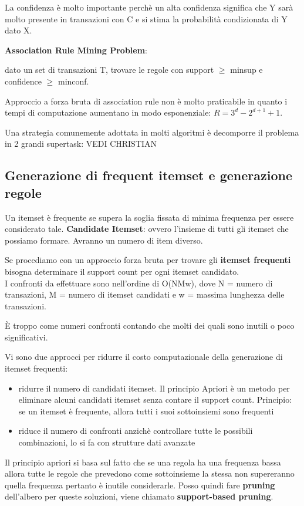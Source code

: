 La confidenza \`e molto importante perch\`e un alta confidenza significa che Y sar\`a molto presente in transazioni con C e si stima la probabilit\`a  condizionata di Y dato X.

\textbf{Association Rule Mining Problem}:

dato un set di transazioni T, trovare le regole con support $\ge$ minsup e confidence $\ge$ minconf.

Approccio a forza bruta di association rule non \`e molto praticabile in quanto i tempi di computazione aumentano in modo esponenziale: $R = 3^d - 2^{d+1} + 1$.

Una strategia comunemente adottata in molti algoritmi \`e decomporre il problema in 2 grandi supertask:
VEDI CHRISTIAN


\subsection{Generazione di frequent itemset e generazione regole}

Un itemset \`e frequente se supera la soglia fissata di minima frequenza per essere considerato tale. 
\textbf{Candidate Itemset}: ovvero l'insieme di tutti gli itemset che possiamo formare. Avranno un numero di item diverso. 

Se procediamo con un approccio forza bruta per trovare gli \textbf{itemset frequenti} bisogna determinare il support count per ogni itemset candidato. \\
I confronti da effettuare sono nell'ordine di O(NMw), dove N = numero di transazioni, M = numero di itemset candidati e w = massima lunghezza delle transazioni. 

\`E troppo come numeri confronti contando che molti dei quali sono inutili o poco significativi.

Vi sono due approcci per ridurre il costo computazionale della generazione di itemset frequenti:
\begin{itemize}
	\item ridurre il numero di candidati itemset. Il principio Apriori \`e un metodo per eliminare alcuni candidati itemset senza contare il support count. Principio: se un itemset \`e frequente, allora tutti i suoi sottoinsiemi sono frequenti
	\item riduce il numero di confronti anzich\`e controllare tutte le possibili combinazioni, lo si fa con strutture dati avanzate
\end{itemize}

Il principio apriori si basa sul fatto che se una regola ha una frequenza bassa allora tutte le regole che prevedono come sottoinsieme la stessa non supereranno quella frequenza pertanto \`e inutile considerarle. Posso quindi fare \textbf{pruning} dell'albero per queste soluzioni, viene chiamato \textbf{support-based pruning}.

